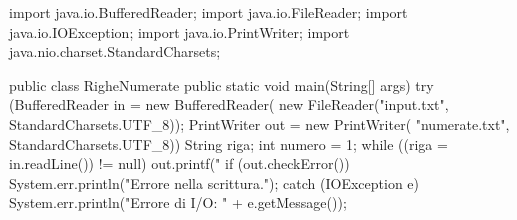 \begin{unipdcode}[language=Java]
import java.io.BufferedReader;
import java.io.FileReader;
import java.io.IOException;
import java.io.PrintWriter;
import java.nio.charset.StandardCharsets;

public class RigheNumerate {
    public static void main(String[] args) {
        try (BufferedReader in = new BufferedReader(
                new FileReader("input.txt", StandardCharsets.UTF_8));
             PrintWriter out = new PrintWriter(
                "numerate.txt", StandardCharsets.UTF_8)) {
            String riga;
            int numero = 1;
            while ((riga = in.readLine()) != null) {
                out.printf("%
            }
            if (out.checkError()) System.err.println("Errore nella scrittura.");
        } catch (IOException e) {
            System.err.println("Errore di I/O: " + e.getMessage());
        }
    }
}
\end{unipdcode}
